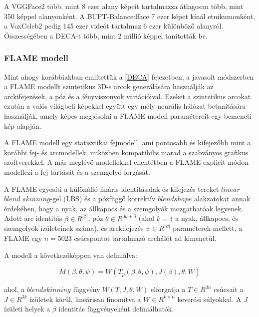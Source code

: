\documentclass[12pt,a4]{article}
\begin{document}
                A VGGFace2 több, mint 8 ezer alany képeit tartalmazza átlagosan több,
     	          mint 350 képpel alanyonként. A BUPT-Balancedface 7 ezer képet kínál
     	          etnikumonként, a VoxCeleb2 pedig 145 ezer videót tartalmaz 6 ezer
     	          különböző alanyról. Összességében a DECA-t több, mint 2 millió képpel tanították
     	          be.

            \subsubsection{FLAME modell}

                Mint ahogy korábbiakban említettük a \ref{DECA} fejezetben, a javasolt módszerben a FLAME modellt szintetikus 3D-s arcok generálására használják az arckifejezések, a póz és a fényviszonyok variációival. Ezeket a szintetikus arcokat ezután a valós világbeli képekkel együtt egy mély neurális hálózat betanítására használják, amely képes megjósolni a FLAME modell paramétereit egy bemeneti kép alapján.

                A \cite{flame}FLAME modell egy statisztikai fejmodell, ami pontosabb és kifejezőbb mint a korábbi fej- és arcmodellek, miközben kompatibilis marad a szabványos grafikus szoftverekkel. A már meglévő modellekkel ellentétben a FLAME explicit módon modellezi a fej tartását és a szemgolyó forgását.

                A FLAME egyesíti a különálló lináris identitásalak és kifejezés tereket $linear$ $blend$ $skinning$-gel (LBS) és a pózfüggő korrektív $blendshape$ alakzatokat annak érdekében, hogy a nyak, az állkapocs és a szemgolyók mozgathatóak legyenek. Adott arc identitás $\beta \in R^{|\beta|}$, póz $\theta \in R^{3k+3}$ (ahol $k = 4$ a nyak, állkapocs, és szemgolyók ízületeinek száma), és arckifejezés $\psi \in R^{|\psi|}$ paraméterek mellett, a FLAME egy $n = 5023 $ csúcspontot tartalmazó archálót ad kimenetül.

                A modell a következőképpen van definiálva: 

                \begin{equation*}
                    M (\beta, \theta, \psi) = W (T_{p}(\beta, \theta, \psi), J(\beta), \theta, W)
                \end{equation*}

                ahol, a $blendskinning$ függvény $W (T, J, θ, W)$ elforgatja a  $T \in R^{3n}$ csúcsait a $J \in R^{3k}$ ízületek körül, lineárisan finomítva a $W \in R^{k\times n}$ keverési súlyokkal. A $J$ ízületi helyek a $\beta$ identitás függvényeként definiálhatók.
\end{document}
